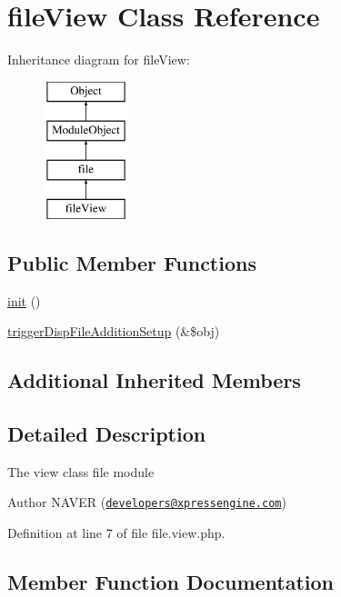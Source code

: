\hypertarget{classfileView}{}\section{file\+View Class Reference}
\label{classfileView}
Inheritance diagram for file\+View\+:\begin{figure}[H]
\begin{center}
\leavevmode
\includegraphics[height=4.000000cm]{classfileView}
\end{center}
\end{figure}
\subsection*{Public Member Functions}
\begin{DoxyCompactItemize}
\item 
\hyperlink{classfileView_a57621b8a911bfe916164f7210ae57d00}{init} ()
\item 
\hyperlink{classfileView_a7df980966b9a93c9416959ba21c14c55}{trigger\+Disp\+File\+Addition\+Setup} (\&\$obj)
\end{DoxyCompactItemize}
\subsection*{Additional Inherited Members}


\subsection{Detailed Description}
The view class file module \begin{DoxyAuthor}{Author}
N\+A\+V\+ER (\href{mailto:developers@xpressengine.com}{\tt developers@xpressengine.\+com}) 
\end{DoxyAuthor}


Definition at line 7 of file file.\+view.\+php.



\subsection{Member Function Documentation}
\mbox{\label{classfileView_a57621b8a911bfe916164f7210ae57d00}} 

